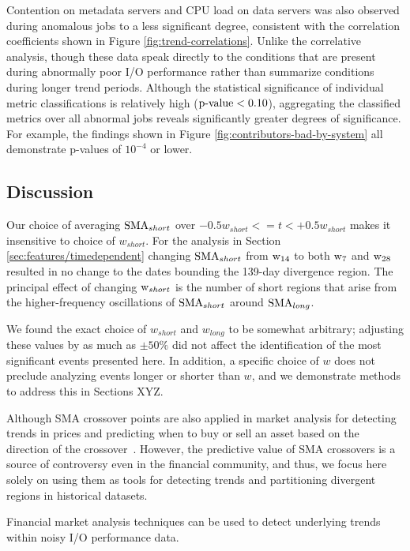 Contention on metadata servers and CPU load on data servers was also observed during anomalous jobs to a less significant degree, consistent with the correlation coefficients shown in Figure \ref{fig:trend-correlations}.
Unlike the correlative analysis, though these data speak directly to the conditions that are present during abnormally poor I/O performance rather than summarize conditions during longer trend periods.
Although the statistical significance of individual metric classifications is relatively high (${\textup{p-value} < 0.10}$), aggregating the classified metrics over all abnormal jobs reveals significantly greater degrees of significance.
For example, the findings shown in Figure \ref{fig:contributors-bad-by-system} all demonstrate p-values of $10^{-4}$ or lower.





\subsection {Discussion}
\label{sec:results/discussion}


Our choice of averaging $\textup{SMA}_{short}$ over ${-0.5w_{short} <= t < +0.5w_{short}}$ makes it insensitive to choice of $w_{short}$.
For the analysis in Section \ref{sec:features/timedependent} changing $\textup{SMA}_{short}$ from $\textup{w}_{14}$ to both $\textup{w}_{7}$ and $\textup{w}_{28}$ resulted in no change to the dates bounding the 139-day divergence region.
The principal effect of changing $\textup{w}_{short}$ is the number of short regions that arise from the higher-frequency oscillations of $\textup{SMA}_{short}$ around $\textup{SMA}_{long}$.


We found the exact choice of $w_{short}$ and $w_{long}$ to be somewhat arbitrary; adjusting these values by as much as $\pm 50\%$ did not affect the identification of the most significant events presented here.
In addition, a specific choice of $w$ does not preclude analyzing events longer or shorter than $w$, and we demonstrate methods to address this in Sections XYZ.

Although SMA crossover points are also applied in market analysis for detecting trends in prices and predicting when to buy or sell an asset based on the direction of the crossover~\cite{brock1992simple}.
However, the predictive value of SMA crossovers is a source of controversy even in the financial community, and thus, we focus here solely on using them as tools for detecting trends and partitioning divergent regions in historical datasets.

Financial market analysis techniques can be used to detect underlying trends within noisy I/O performance data.
